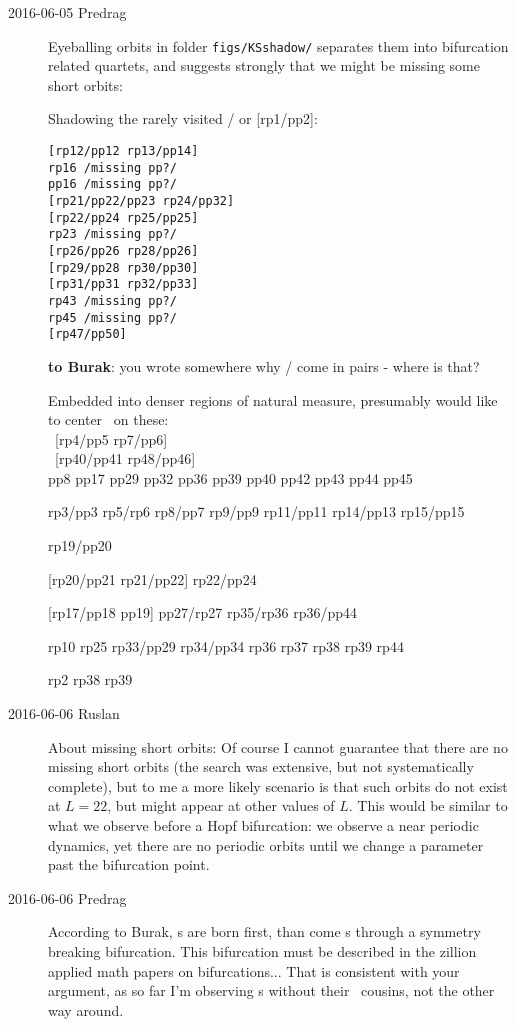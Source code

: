 \begin{description}
\item[2016-06-05 Predrag] Eyeballing orbits in folder
\texttt{figs/KSshadow/} separates them into bifurcation related quartets,
and suggests strongly that we might be missing some short orbits:

Shadowing the rarely visited   /  or [rp1/pp2]:

\begin{verbatim}
[rp12/pp12 rp13/pp14]
rp16 /missing pp?/
pp16 /missing pp?/
[rp21/pp22/pp23 rp24/pp32]
[rp22/pp24 rp25/pp25]
rp23 /missing pp?/
[rp26/pp26 rp28/pp26]
[rp29/pp28 rp30/pp30]
[rp31/pp31 rp32/pp33]
rp43 /missing pp?/
rp45 /missing pp?/
[rp47/pp50]
\end{verbatim}

{\bf to Burak}: you wrote somewhere why  /  come in
pairs - where is that?

Embedded into denser regions of natural measure, presumably would like to
center \PoincSec\ on these:
\\
~[rp4/pp5 rp7/pp6]
\\
~[rp40/pp41 rp48/pp46]
\\
pp8 pp17 pp29 pp32 pp36 pp39 pp40  pp42 pp43 pp44 pp45

rp3/pp3  rp5/rp6 rp8/pp7 rp9/pp9 rp11/pp11 rp14/pp13 rp15/pp15

rp19/pp20

[rp20/pp21 rp21/pp22] rp22/pp24

[rp17/pp18 pp19] pp27/rp27 rp35/rp36 rp36/pp44

rp10 rp25 rp33/pp29 rp34/pp34 rp36 rp37 rp38 rp39  rp44

rp2 rp38 rp39

\item[2016-06-06 Ruslan] About missing short orbits: Of course I cannot
guarantee that there are no missing short orbits (the search was
extensive, but not systematically complete), but to me a more likely
scenario is that such orbits do not exist at $L = 22$, but might appear
at other values of $L$.  This would be similar to what we observe before
a Hopf bifurcation: we observe a near periodic dynamics, yet there are no
periodic orbits until we change a parameter past the bifurcation point.

\item[2016-06-06 Predrag] According to Burak, \ppo s are born first, than
come \rpo s through a symmetry breaking bifurcation. This bifurcation
must be described in the zillion applied math papers on 
bifurcations... That is consistent with your argument, as so far I'm
observing \ppo s without their \rpo\ cousins, not the other way around.


\end{description}
